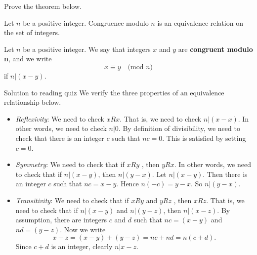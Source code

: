 \documentclass[10pt]{beamer}
\begin{document}
\begin{frame}
 \begin{myredbox}[title=Reading Quiz (Equivalence Relations) (Extra Credit)]  
 Prove the theorem below. 
\end{myredbox}
\vfill 
\begin{myyellowbox}[title=Theorem]
Let $n$ be a positive integer.  Congruence modulo $n$ is an equivalence relation on the set of integers.
\end{myyellowbox}
\vfill 
\begin{mygreenbox}[title=Definition]
Let $n$ be a positive integer.  We say that integers $x$ and $y$ are \textbf{congruent modulo n}, and we write 
\[x \equiv y \quad \text{(mod $n$)} \]
if $n | (x-y)$.
\end{mygreenbox}
\vfill 
\end{frame}

\begin{frame}{Solution to reading quiz}
\small 
\pause 
We verify the three properties of an equivalence relationship below. 

\begin{itemize}
\item \textit{Reflexivity}: \pause  We need to check $xRx$. That is, we need to check $n|(x-x)$. In other words, we need to check $n|0$.  By definition of divisibility, we need to check that there is an integer $c$ such that $nc=0$.  This is satisfied by setting $c=0$. \; \greencheck 
\item \textit{Symmetry}:\pause   \; We need to check that if $xRy$ , then $yRx$.  In other words, we need to check that if $n|(x-y)$, then $n|(y-x)$.  Let $n|(x-y)$. Then there is an integer $c$ such that $nc = x-y$.  Hence $n(-c) = y-x$.  So $n|(y-x)$.  \; \greencheck  
\item \textit{Transitivity}:  \pause  We need to check that if $xRy$ and $yRz$ , then $xRz$.   That is, we need to check that if $n|(x-y)$ and $n|(y-z)$, then $n|(x-z)$.  By assumption, there are integers $c$ and $d$ such that $nc=(x-y)$ and $nd=(y-z)$.  Now we write
 	\[ x-z = (x-y) + (y-z) = nc + nd = n(c+d).\]
 	Since $c+d$ is an integer, clearly $n|x-z$. \; \greencheck
\end{itemize}
\end{frame}
\end{document}
